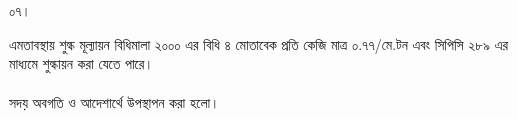 \documentclass[12pt]{article}
\begin{document}
\begin{minipage}[t]{0.05\linewidth}
০৭।
\end{minipage}
\begin{minipage}[t]{0.95\linewidth}
এমতাবস্থায় শুল্ক মূল্যায়ন বিধিমালা ২০০০ এর
বিধি ৪ মোতাবেক প্রতি কেজি মাত্র ০.৭৭/মে.টন
এবং সিপিসি ২৮৯ এর মাধ্যমে শুল্কায়ন করা যেতে
পারে।
\\
\\
সদয় অবগতি ও আদেশার্থে উপস্থাপন করা হলো।
\end{minipage}

\thispagestyle{laststyle}
\end{document}
